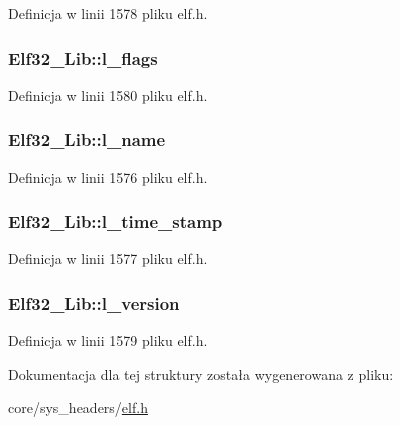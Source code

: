 Definicja w linii 1578 pliku elf.\-h.

\hypertarget{struct_elf32___lib_a4a0feb8162591596d3653f561ee8759e}{
\subsubsection[{l\-\_\-flags}]{ Elf32\-\_\-\-Lib\-::l\-\_\-flags}}\label{struct_elf32___lib_a4a0feb8162591596d3653f561ee8759e}


Definicja w linii 1580 pliku elf.\-h.

\hypertarget{struct_elf32___lib_af40827a2882aaf96d42ae60dac6551ee}{
\subsubsection[{l\-\_\-name}]{ Elf32\-\_\-\-Lib\-::l\-\_\-name}}\label{struct_elf32___lib_af40827a2882aaf96d42ae60dac6551ee}


Definicja w linii 1576 pliku elf.\-h.

\hypertarget{struct_elf32___lib_ae7119079569dcf7ecebccc47cb6350be}{
\subsubsection[{l\-\_\-time\-\_\-stamp}]{ Elf32\-\_\-\-Lib\-::l\-\_\-time\-\_\-stamp}}\label{struct_elf32___lib_ae7119079569dcf7ecebccc47cb6350be}


Definicja w linii 1577 pliku elf.\-h.

\hypertarget{struct_elf32___lib_ab1be8296800ef7b233adb56f1cfb901c}{
\subsubsection[{l\-\_\-version}]{ Elf32\-\_\-\-Lib\-::l\-\_\-version}}\label{struct_elf32___lib_ab1be8296800ef7b233adb56f1cfb901c}


Definicja w linii 1579 pliku elf.\-h.



Dokumentacja dla tej struktury została wygenerowana z pliku\-:\begin{DoxyCompactItemize}
\item 
core/sys\-\_\-headers/\hyperlink{elf_8h}{elf.\-h}\end{DoxyCompactItemize}
